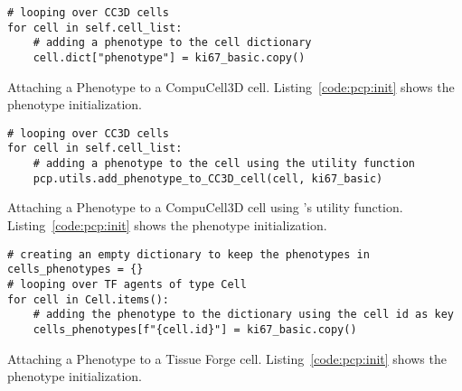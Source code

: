 \begin{listing}[!htbp]
\begin{verbatim}
# looping over CC3D cells
for cell in self.cell_list:
    # adding a phenotype to the cell dictionary
    cell.dict["phenotype"] = ki67_basic.copy()
\end{verbatim}
\caption{Attaching a Phenotype to a CompuCell3D cell. Listing~\ref{code:pcp:init} shows the phenotype initialization.}\label{code:pcp:attach-cc3d}
\end{listing}

\begin{listing}[!htbp]
\begin{verbatim}
# looping over CC3D cells
for cell in self.cell_list:
    # adding a phenotype to the cell using the utility function
    pcp.utils.add_phenotype_to_CC3D_cell(cell, ki67_basic)
\end{verbatim}
\caption{Attaching a Phenotype to a CompuCell3D cell using \pcp's utility function. Listing~\ref{code:pcp:init} shows the phenotype initialization.}\label{code:pcp:attach-cc3d:util}
\end{listing}

\begin{listing}[!htbp]
\begin{verbatim}
# creating an empty dictionary to keep the phenotypes in
cells_phenotypes = {}
# looping over TF agents of type Cell
for cell in Cell.items():
    # adding the phenotype to the dictionary using the cell id as key
    cells_phenotypes[f"{cell.id}"] = ki67_basic.copy()
\end{verbatim}
\caption{Attaching a Phenotype to a Tissue Forge cell. Listing~\ref{code:pcp:init} shows the phenotype initialization.}\label{code:pcp:attach-tf}
\end{listing}


